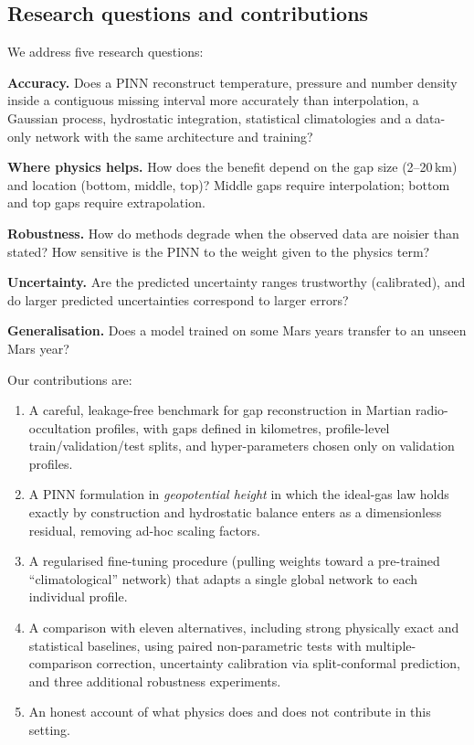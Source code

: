 \documentclass[11pt,a4paper]{article}
\begin{document}
\subsection{Research questions and contributions}
We address five research questions:
\begin{description}[leftmargin=1.2cm,style=nextline]
\item[RQ1] \textbf{Accuracy.} Does a PINN reconstruct temperature, pressure and number density inside a contiguous missing interval more accurately than interpolation, a Gaussian process, hydrostatic integration, statistical climatologies and a data-only network with the same architecture and training?
\item[RQ2] \textbf{Where physics helps.} How does the benefit depend on the gap size (2--20\,km) and location (bottom, middle, top)? Middle gaps require interpolation; bottom and top gaps require extrapolation.
\item[RQ3] \textbf{Robustness.} How do methods degrade when the observed data are noisier than stated? How sensitive is the PINN to the weight given to the physics term?
\item[RQ4] \textbf{Uncertainty.} Are the predicted uncertainty ranges trustworthy (calibrated), and do larger predicted uncertainties correspond to larger errors?
\item[RQ5] \textbf{Generalisation.} Does a model trained on some Mars years transfer to an unseen Mars year?
\end{description}

Our contributions are:
\begin{enumerate}[leftmargin=*]
\item A careful, leakage-free benchmark for gap reconstruction in Martian radio-occultation profiles, with gaps defined in kilometres, profile-level train/validation/test splits, and hyper-parameters chosen only on validation profiles.
\item A PINN formulation in \emph{geopotential height} in which the ideal-gas law holds exactly by construction and hydrostatic balance enters as a dimensionless residual, removing ad-hoc scaling factors.
\item A regularised fine-tuning procedure (pulling weights toward a pre-trained ``climatological'' network) that adapts a single global network to each individual profile.
\item A comparison with eleven alternatives, including strong physically exact and statistical baselines, using paired non-parametric tests with multiple-comparison correction, uncertainty calibration via split-conformal prediction, and three additional robustness experiments.
\item An honest account of what physics does and does not contribute in this setting.
\end{enumerate}
\end{document}

